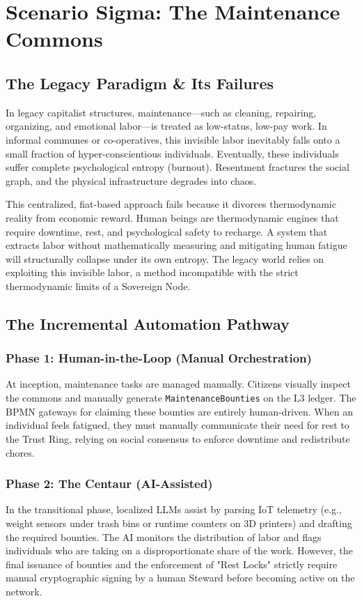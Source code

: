\chapter{Scenario Sigma: The Maintenance Commons}
\label{ch:scenario_sigma}

\section{The Legacy Paradigm \& Its Failures}
In legacy capitalist structures, maintenance—such as cleaning, repairing, organizing, and emotional labor—is treated as low-status, low-pay work. In informal communes or co-operatives, this invisible labor inevitably falls onto a small fraction of hyper-conscientious individuals. Eventually, these individuals suffer complete psychological entropy (burnout). Resentment fractures the social graph, and the physical infrastructure degrades into chaos.

This centralized, fiat-based approach fails because it divorces thermodynamic reality from economic reward. Human beings are thermodynamic engines that require downtime, rest, and psychological safety to recharge. A system that extracts labor without mathematically measuring and mitigating human fatigue will structurally collapse under its own entropy. The legacy world relies on exploiting this invisible labor, a method incompatible with the strict thermodynamic limits of a Sovereign Node.

\section{The Incremental Automation Pathway}

\subsection{Phase 1: Human-in-the-Loop (Manual Orchestration)}
At inception, maintenance tasks are managed manually. Citizens visually inspect the commons and manually generate \texttt{MaintenanceBounties} on the L3 ledger. The BPMN gateways for claiming these bounties are entirely human-driven. When an individual feels fatigued, they must manually communicate their need for rest to the Trust Ring, relying on social consensus to enforce downtime and redistribute chores.

\subsection{Phase 2: The Centaur (AI-Assisted)}
In the transitional phase, localized LLMs assist by parsing IoT telemetry (e.g., weight sensors under trash bins or runtime counters on 3D printers) and drafting the required bounties. The AI monitors the distribution of labor and flags individuals who are taking on a disproportionate share of the work. However, the final issuance of bounties and the enforcement of "Rest Locks" strictly require manual cryptographic signing by a human Steward before becoming active on the network.

